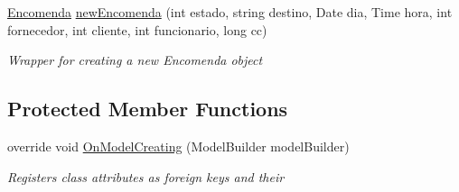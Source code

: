 \begin{DoxyCompactItemize}
\mbox{\hyperlink{classmvc_j_j_m_s_1_1_models_1_1_encomenda}{Encomenda}} \mbox{\hyperlink{classmvc_j_j_m_s_1_1_data_1_1_j_j_m_s_context_ab41e73771fc76a06f3bbbd83df523438}{new\+Encomenda}} (int estado, string destino, Date dia, Time hora, int fornecedor, int cliente, int funcionario, long cc)
\begin{DoxyCompactList}\small\item\em Wrapper for creating a new Encomenda object \end{DoxyCompactList}\end{DoxyCompactItemize}
\subsection*{Protected Member Functions}
\begin{DoxyCompactItemize}
\item 
override void \mbox{\hyperlink{classmvc_j_j_m_s_1_1_data_1_1_j_j_m_s_context_aadc81d0f274fa7d1909d94c7363e5f4a}{On\+Model\+Creating}} (Model\+Builder model\+Builder)
\begin{DoxyCompactList}\small\item\em Registers class attributes as foreign keys and their \end{DoxyCompactList}\end{DoxyCompactItemize}
